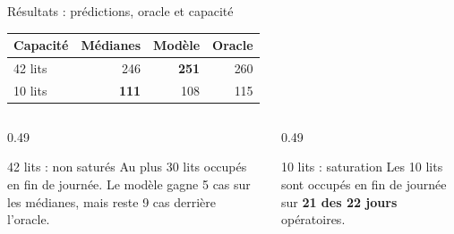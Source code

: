 \begin{frame}{Résultats : prédictions, oracle et capacité}
  \small
  \centering
  \renewcommand{\arraystretch}{1.40}
  \setlength{\tabcolsep}{11pt}
  \begin{tabular}{lrrr}
    \toprule
    Capacité & Médianes & Modèle & Oracle \\
    \midrule
    42 lits & 246 & \textbf{251} & 260 \\
    10 lits & \textbf{111} & 108 & 115 \\
    \bottomrule
  \end{tabular}
  \vspace{0.38cm}
  \begin{columns}[T,onlytextwidth]
    \begin{column}{0.49\textwidth}
      \begin{block}{42 lits : non saturés}
        \small Au plus 30 lits occupés en fin de journée.
        Le modèle gagne 5 cas sur les médianes, mais reste
        9 cas derrière l'oracle.
      \end{block}
    \end{column}
    \begin{column}{0.49\textwidth}
      \begin{alertblock}{10 lits : saturation}
        \small Les 10 lits sont occupés en fin de journée
        sur \textbf{21 des 22 jours} opératoires.
      \end{alertblock}
    \end{column}
  \end{columns}
\end{frame}

